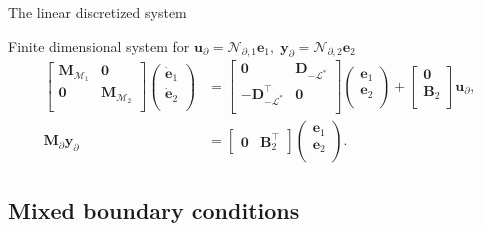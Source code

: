 \documentclass[aspectratio=169]{ISAE-Beamer}
\begin{document}
\begin{frame}{The linear discretized system}
\begin{exampleblock}{Finite dimensional system for $\bm{u}_\partial = \mathcal{N}_{\partial, 1} \displaystyle \bm{e}_1, \;  \bm{y}_\partial = \mathcal{N}_{\partial, 2} \displaystyle \bm{e}_2$}
	\begin{equation*}
	\begin{aligned}
	\begin{bmatrix}
	\mathbf{M}_{\mathcal{M}_1} & \mathbf{0} \\
	\mathbf{0} & \mathbf{M}_{\mathcal{M}_2} \\
	\end{bmatrix}
	\begin{pmatrix}
	\dot{\mathbf{e}}_{1} \\
	\dot{\mathbf{e}}_{2} \\
	\end{pmatrix}
	&= \begin{bmatrix}
	\mathbf{0} & \mathbf{D}_{-\mathcal{L}^*} \\
	- \mathbf{D}_{-\mathcal{L}^*}^\top & \mathbf{0} \\
	\end{bmatrix} 
	\begin{pmatrix}
	\mathbf{e}_{1} \\
	\mathbf{e}_{2} \\
	\end{pmatrix} + 
	\begin{bmatrix}
	\mathbf{0}\\
	\mathbf{B}_2\\
	\end{bmatrix}
	\mathbf{u}_\partial, \\
	\mathbf{M}_\partial {\mathbf{y}_\partial} &= 
	\begin{bmatrix}
	\mathbf{0} & \mathbf{B}_2^\top 
	\end{bmatrix}\begin{pmatrix}
	\mathbf{e}_{1} \\
	\mathbf{e}_{2} \\
	\end{pmatrix}.
	\end{aligned}
	\end{equation*}
\end{exampleblock}
	
\end{frame}


\subsection{Mixed boundary conditions}
\end{document}
